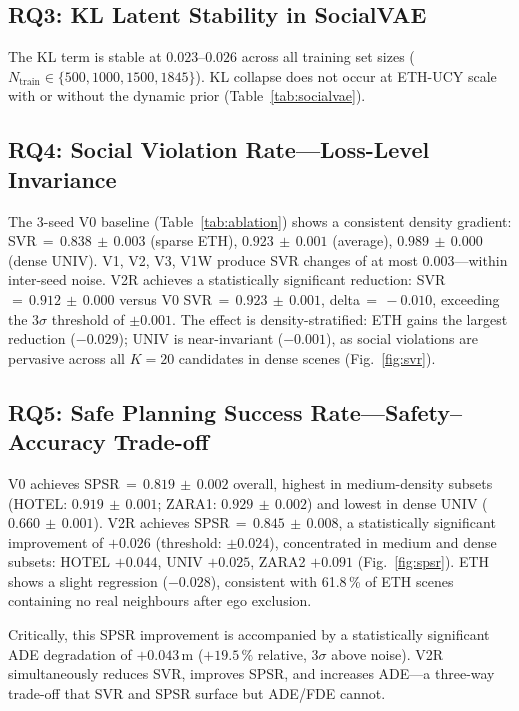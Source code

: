 \documentclass[journal,letterpaper]{IEEEtran}
\begin{document}
\subsection{RQ3: KL Latent Stability in SocialVAE}

The KL term is stable at $0.023$--$0.026$ across all training set
sizes ($N_\text{train}\in\{500,1000,1500,1845\}$).
KL collapse does not occur at ETH-UCY scale with or without the
dynamic prior (Table~\ref{tab:socialvae}).

\subsection{RQ4: Social Violation Rate---Loss-Level Invariance}

The 3-seed V0 baseline (Table~\ref{tab:ablation}) shows a consistent
density gradient: SVR\,\(=\,0.838\,\pm\,0.003\) (sparse ETH),
$0.923\,\pm\,0.001$ (average), $0.989\,\pm\,0.000$ (dense UNIV).
V1, V2, V3, V1W produce SVR changes of at most $0.003$---within
inter-seed noise.
V2R achieves a statistically significant reduction: SVR\,\(=\,0.912\,\pm\,0.000\)
versus V0 SVR\,\(=\,0.923\,\pm\,0.001\), delta\,\(=\,-0.010\),
exceeding the $3\sigma$ threshold of $\pm0.001$.
The effect is density-stratified: ETH gains the largest reduction
($-0.029$); UNIV is near-invariant ($-0.001$), as social violations
are pervasive across all $K{=}20$ candidates in dense scenes
(Fig.~\ref{fig:svr}).

\subsection{RQ5: Safe Planning Success Rate---Safety--Accuracy Trade-off}

V0 achieves SPSR\,\(=\,0.819\,\pm\,0.002\) overall, highest in
medium-density subsets (HOTEL: $0.919\,\pm\,0.001$;
ZARA1: $0.929\,\pm\,0.002$) and lowest in dense UNIV
($0.660\,\pm\,0.001$).
V2R achieves SPSR\,\(=\,0.845\,\pm\,0.008\), a statistically
significant improvement of $+0.026$ (threshold: $\pm0.024$),
concentrated in medium and dense subsets: HOTEL $+0.044$,
UNIV $+0.025$, ZARA2 $+0.091$ (Fig.~\ref{fig:spsr}).
ETH shows a slight regression ($-0.028$), consistent with
61.8\,\% of ETH scenes containing no real neighbours after ego
exclusion.

Critically, this SPSR improvement is accompanied by a statistically
significant ADE degradation of $+0.043$\,m ($+19.5\,\%$ relative,
$3\sigma$ above noise).
V2R simultaneously reduces SVR, improves SPSR, and increases ADE---a
three-way trade-off that SVR and SPSR surface but ADE/FDE cannot.
\end{document}
